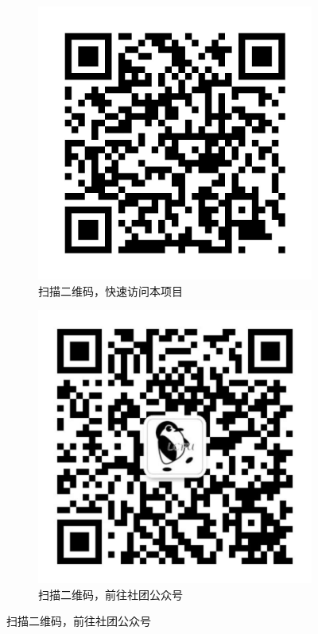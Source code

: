 \documentclass[../main.tex]{subfiles}
\begin{document}
\begin{figure}[ht]
    \centering
    \begin{subfigure}{0.45\textwidth}
    \centering
    \includegraphics[width=\textwidth]{images/qrcode.png}
    \caption{扫描二维码，快速访问本项目}
    \end{subfigure}
    \begin{subfigure}{0.45\textwidth}
    \centering
    \includegraphics[width=\textwidth]{images/qrcode-club.jpg}
    \caption{扫描二维码，前往社团公众号}
    \end{subfigure}
\end{figure}
\end{document}
